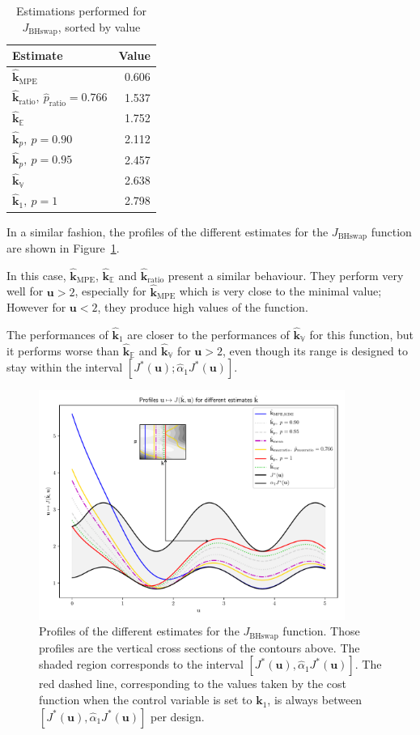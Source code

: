 \documentclass[preprint, 1p]{elsarticle}
\newcommand{\Ex}{\mathbb{E}}
\newcommand{\hatkmean}{\hat{\mathbf{k}}_{\Ex}}
\newcommand{\hatkvar}{\hat{\mathbf{k}}_{\mathbb{V}}}
\newcommand{\hatkmpe}{\hat{\mathbf{k}}_{\mathrm{MPE}}}
\newcommand{\kest}{\hat{\mathbf{k}}}
\newcommand{\checka}{{\alpha}}
\newcommand{\checkk}{\mathbf{k}}
\begin{document}
\begin{table}[!h]
\centering
\caption{Estimations performed for $J_{\mathrm{BHswap}}$, sorted by value}
\label{tab:recap_estimates_BHs}
\begin{tabular}{lr} \toprule
Estimate & Value \\ \midrule
$\kest_{\mathrm{MPE}}$ & 0.606 \\ 
$\kest_{\mathrm{ratio}},~ \hat{p}_{\mathrm{ratio}}=0.766$ & 1.537 \\ 
$\hatkmean$ & 1.752 \\ 
$\kest_p,~p=0.90$ & 2.112 \\ 
$\kest_p,~p=0.95$ & 2.457 \\ 
$\hatkvar$ & 2.638 \\ 
$\kest_1,~p=1$ & 2.798   \\ \bottomrule
\end{tabular}
\end{table}


In a similar fashion, the profiles of the different estimates for the $J_{\mathrm{BHswap}}$ function are shown in Figure~\ref{fig:profiles_branin_switch}.

In this case, $\hatkmpe$, $\hatkmean$ and $\hat{\checkk}_{\mathrm{ratio}}$ present a similar behaviour. They perform very well for $\mathbf{u}>2$, especially for $\hatkmpe$ which is very close to the minimal value; However for $\mathbf{u}<2$, they produce high values of the function.

The performances of $\hat{\checkk}_1$ are closer to the performances of $\hatkvar$ for this function, but it performs worse than $\hatkmean$ and $\hatkvar$ for $\mathbf{u}>2$, even though its range is designed to stay within the interval $[J^*(\mathbf{u}); \hat{\checka}_1 J^*(\mathbf{u})]$.


\begin{figure}[!h]
  \centering
\includegraphics[width=10cm]{Figures/profile_BHs_all_estimates_noku.pdf}
\caption{Profiles of the different estimates for the $J_{\mathrm{BHswap}}$ function. Those profiles are the vertical cross sections of the contours above. The shaded region corresponds to the interval $[J^*(\mathbf{u}), \hat{\checka}_1 J^*(\mathbf{u})]$. The red dashed line, corresponding to the values taken by the cost function when the control variable is set to $\mathbf{k}_1$, is always between $[J^*(\mathbf{u}), \hat{\checka}_1 J^*(\mathbf{u})]$ per design.}
\label{fig:profiles_branin_switch}
\end{figure}
\end{document}
